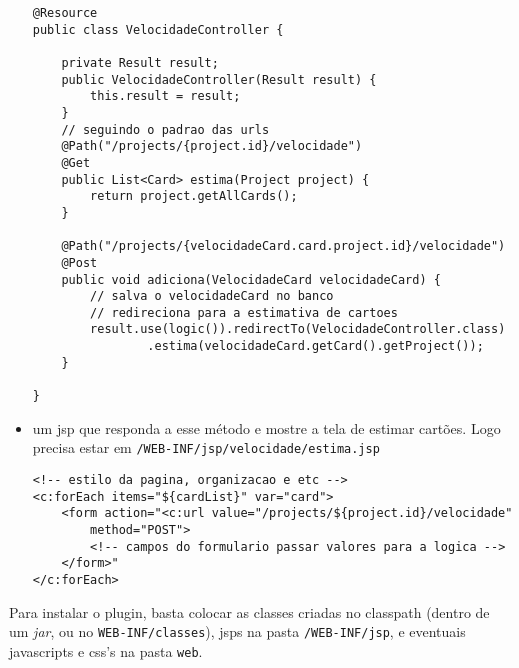 \begin{itemize}
{\begin{lstlisting}
@Resource
public class VelocidadeController {
	
	private Result result;
	public VelocidadeController(Result result) {
		this.result = result;
	}
	// seguindo o padrao das urls
	@Path("/projects/{project.id}/velocidade")
	@Get
	public List<Card> estima(Project project) {
		return project.getAllCards();
	}

	@Path("/projects/{velocidadeCard.card.project.id}/velocidade")
	@Post
	public void adiciona(VelocidadeCard velocidadeCard) {
		// salva o velocidadeCard no banco
		// redireciona para a estimativa de cartoes
		result.use(logic()).redirectTo(VelocidadeController.class)
				.estima(velocidadeCard.getCard().getProject());
	}
	
}
		\end{lstlisting}
	}
	
	\item{um jsp que responda a esse método e mostre a tela de estimar cartões. Logo precisa estar em \texttt{/WEB-INF/jsp/velocidade/estima.jsp}
	
		\begin{lstlisting}
<!-- estilo da pagina, organizacao e etc -->
<c:forEach items="${cardList}" var="card">
	<form action="<c:url value="/projects/${project.id}/velocidade" 
		method="POST">
		<!-- campos do formulario passar valores para a logica -->
	</form>"
</c:forEach>
		\end{lstlisting}
	}
\end{itemize}

Para instalar o plugin, basta colocar as classes criadas no classpath (dentro de um \textit{jar}, ou no \texttt{WEB-INF/classes}), jsps na pasta \texttt{/WEB-INF/jsp}, e eventuais javascripts e css's na pasta \texttt{web}.



